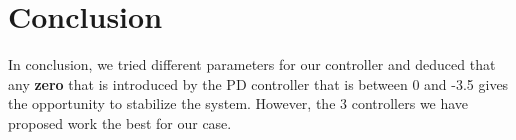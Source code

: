 \section{Conclusion}


In conclusion, we tried different parameters for our controller and deduced that any \textbf{zero} that is introduced by the PD controller that is between 0 and -3.5 gives the opportunity to stabilize the system. However, the 3 controllers we have proposed work the best for our case.